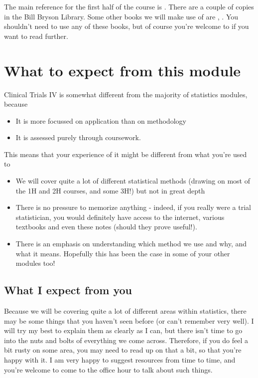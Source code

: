 \documentclass[
  openany]{book}
\providecommand{\tightlist}{%
  \setlength{\itemsep}{0pt}\setlength{\parskip}{0pt}}
\theoremstyle{definition}
\theoremstyle{definition}
\theoremstyle{definition}
\theoremstyle{definition}
\theoremstyle{remark}
\begin{document}
The main reference for the first half of the course is \citet{matthews2006introduction}. There are a couple of copies in the Bill Bryson Library. Some other books we will make use of are \citet{hulley2013designing}, \citet{hayes2017cluster}. You shouldn't need to use any of these books, but of course you're welcome to if you want to read further.

\hypertarget{what-to-expect-from-this-module}{%
\section*{What to expect from this module}\label{what-to-expect-from-this-module}}

Clinical Trials IV is somewhat different from the majority of statistics modules, because

\begin{itemize}
\tightlist
\item
  It is more focussed on application than on methodology
\item
  It is assessed purely through coursework.
\end{itemize}

This means that your experience of it might be different from what you're used to

\begin{itemize}
\tightlist
\item
  We will cover quite a lot of different statistical methods (drawing on most of the 1H and 2H courses, and some 3H!) but not in great depth
\item
  There is no pressure to memorize anything - indeed, if you really were a trial statistician, you would definitely have access to the internet, various textbooks and even these notes (should they prove useful!).
\item
  There is an emphasis on understanding which method we use and why, and what it means. Hopefully this has been the case in some of your other modules too!
\end{itemize}

\hypertarget{what-i-expect-from-you}{%
\subsection*{What I expect from you}\label{what-i-expect-from-you}}

Because we will be covering quite a lot of different areas within statistics, there may be some things that you haven't seen before (or can't remember very well). I will try my best to explain them as clearly as I can, but there isn't time to go into the nuts and bolts of everything we come across. Therefore, if you do feel a bit rusty on some area, you may need to read up on that a bit, so that you're happy with it. I am very happy to suggest resources from time to time, and you're welcome to come to the office hour to talk about such things.
\end{document}

